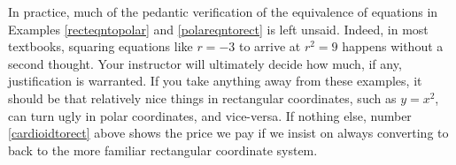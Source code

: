 \pagebreak

In practice, much of the pedantic verification of the equivalence of equations in Examples \ref{recteqntopolar} and \ref{polareqntorect} is left unsaid.  Indeed, in most textbooks, squaring equations like $r=-3$ to arrive at $r^2=9$ happens without a second thought. Your instructor will ultimately decide how much, if any, justification is warranted. If you take anything away from these examples, it should be that relatively nice things in rectangular coordinates, such as $y = x^2$, can turn ugly in polar coordinates, and vice-versa.  If nothing else, number \ref{cardioidtorect} above shows the price we pay if we insist on always converting to back to the more familiar rectangular coordinate system.

